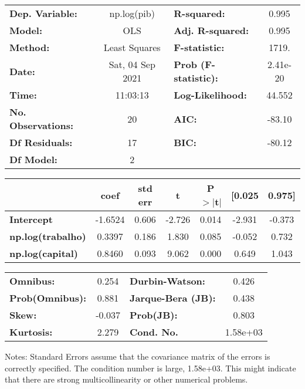 \begin{center}
\begin{tabular}{lclc}
\toprule
\textbf{Dep. Variable:}    &   np.log(pib)    & \textbf{  R-squared:         } &     0.995   \\
\textbf{Model:}            &       OLS        & \textbf{  Adj. R-squared:    } &     0.995   \\
\textbf{Method:}           &  Least Squares   & \textbf{  F-statistic:       } &     1719.   \\
\textbf{Date:}             & Sat, 04 Sep 2021 & \textbf{  Prob (F-statistic):} &  2.41e-20   \\
\textbf{Time:}             &     11:03:13     & \textbf{  Log-Likelihood:    } &    44.552   \\
\textbf{No. Observations:} &          20      & \textbf{  AIC:               } &    -83.10   \\
\textbf{Df Residuals:}     &          17      & \textbf{  BIC:               } &    -80.12   \\
\textbf{Df Model:}         &           2      & \textbf{                     } &             \\
\bottomrule
\end{tabular}
\begin{tabular}{lcccccc}
                          & \textbf{coef} & \textbf{std err} & \textbf{t} & \textbf{P$> |$t$|$} & \textbf{[0.025} & \textbf{0.975]}  \\
\midrule
\textbf{Intercept}        &      -1.6524  &        0.606     &    -2.726  &         0.014        &       -2.931    &       -0.373     \\
\textbf{np.log(trabalho)} &       0.3397  &        0.186     &     1.830  &         0.085        &       -0.052    &        0.732     \\
\textbf{np.log(capital)}  &       0.8460  &        0.093     &     9.062  &         0.000        &        0.649    &        1.043     \\
\bottomrule
\end{tabular}
\begin{tabular}{lclc}
\textbf{Omnibus:}       &  0.254 & \textbf{  Durbin-Watson:     } &    0.426  \\
\textbf{Prob(Omnibus):} &  0.881 & \textbf{  Jarque-Bera (JB):  } &    0.438  \\
\textbf{Skew:}          & -0.037 & \textbf{  Prob(JB):          } &    0.803  \\
\textbf{Kurtosis:}      &  2.279 & \textbf{  Cond. No.          } & 1.58e+03  \\
\bottomrule
\end{tabular}
\end{center}

Notes: \newline
 [1] Standard Errors assume that the covariance matrix of the errors is correctly specified. \newline
 [2] The condition number is large, 1.58e+03. This might indicate that there are \newline
 strong multicollinearity or other numerical problems.